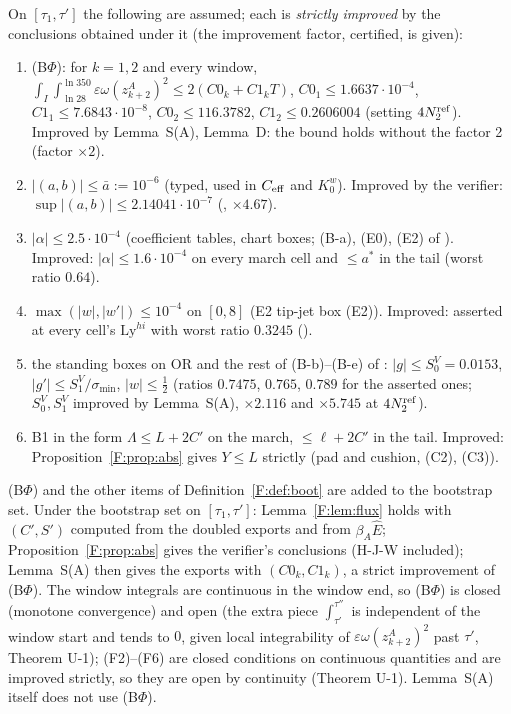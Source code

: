 \documentclass[11pt]{article}
\newcommand{\fn}[1]{\texttt{\detokenize{#1}}}
\begin{document}
\begin{definition}\label{F:def:boot}
On $[\tau_1,\tau']$ the following are assumed; each is \emph{strictly improved} by the conclusions obtained under it (the improvement factor, certified, is given):
\begin{enumerate}[label=(F\arabic*),leftmargin=3em]
\item (B$\Phi$): for $k=1,2$ and every window, $\int_I\!\int_{\ln28}^{\ln350}\varepsilon\omega(z^A_{k+2})^2\le2(C0_k+C1_kT)$, $C0_1\le1.6637\cdot10^{-4}$, $C1_1\le7.6843\cdot10^{-8}$, $C0_2\le116.3782$, $C1_2\le0.2606004$ (setting $4N_2^{\rm ref}$). Improved by Lemma~S(A), Lemma~D: the bound holds without the factor 2 (factor $\times2$).
\item $|(a,b)|\le\bar a:=10^{-6}$ (typed, used in $C_{\rm eff}$ and $K_0^w$). Improved by the verifier: $\sup|(a,b)|\le2.14041\cdot10^{-7}$ (\fn{mod_sups}, $\times4.67$).
\item $|\alpha|\le2.5\cdot10^{-4}$ (coefficient tables, chart boxes; (B-a), (E0), (E2) of \fn{ei_lemma_v4.tex}). Improved: $|\alpha|\le1.6\cdot10^{-4}$ on every march cell and $\le a^*$ in the tail (worst ratio $0.64$).
\item $\max(|w|,|w'|)\le10^{-4}$ on $[0,8]$ (E2 tip-jet box (E2)). Improved: asserted at every cell's $\mathrm{Ly}^{hi}$ with worst ratio $0.3245$ ().
\item the standing boxes on OR and the rest of (B-b)--(B-e) of \fn{ei_lemma_v4.tex}: $|g|\le S^V_0=0.0153$, $|g'|\le S^V_1/\sigma_{\min}$, $|w|\le\frac12$ (ratios $0.7475$, $0.765$, $0.789$ for the asserted ones; $S^V_0,S^V_1$ improved by Lemma~S(A), $\times2.116$ and $\times5.745$ at $4N_2^{\rm ref}$).
\item B1 in the form $\Lambda\le L+2C'$ on the march, $\le\ell+2C'$ in the tail. Improved: Proposition~\ref{F:prop:abs} gives $Y\le L$ strictly (pad and cushion, (C2), (C3)).
\end{enumerate}
\end{definition}

\begin{remark}\label{F:rem:boot}
(B$\Phi$) and the other items of Definition~\ref{F:def:boot} are added to the bootstrap set. Under the bootstrap set on $[\tau_1,\tau']$: Lemma~\ref{F:lem:flux} holds with $(C',S')$ computed from the doubled exports and from $\beta_A\hat E$; Proposition~\ref{F:prop:abs} gives the verifier's conclusions (H-J-W included); Lemma~S(A) then gives the exports with $(C0_k,C1_k)$, a strict improvement of (B$\Phi$). The window integrals are continuous in the window end, so (B$\Phi$) is closed (monotone convergence) and open (the extra piece $\int_{\tau'}^{\tau''}$ is independent of the window start and tends to $0$, given local integrability of $\varepsilon\omega(z^A_{k+2})^2$ past $\tau'$, Theorem U-1); (F2)--(F6) are closed conditions on continuous quantities and are improved strictly, so they are open by continuity (Theorem U-1). Lemma~S(A) itself does not use (B$\Phi$).
\end{remark}
\end{document}
